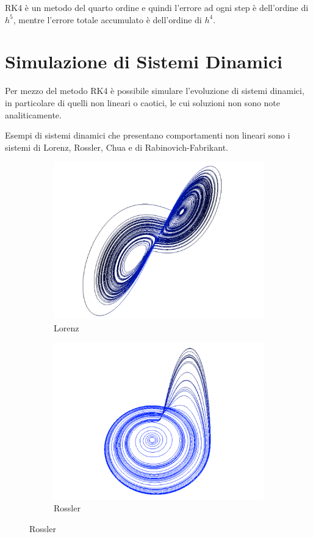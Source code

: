RK4 è un metodo del quarto ordine e quindi l'errore ad ogni step è dell'ordine di $h^5$, mentre l'errore totale accumulato è dell'ordine di $h^4$.

\section{Simulazione di Sistemi Dinamici}
Per mezzo del metodo RK4 è possibile simulare l'evoluzione di sistemi dinamici, in particolare di quelli non lineari o caotici, le cui soluzioni non sono note analiticamente.

Esempi di sistemi dinamici che presentano comportamenti non lineari sono i sistemi di Lorenz, Rossler, Chua e di Rabinovich-Fabrikant.

\begin{figure}[H]
 \begin{subfigure}[b]{0.5\textwidth}
  \centering
  \includegraphics[width=\textwidth]{lorenz}
  \caption{Lorenz}
  \label{fig:lorenz}
 \end{subfigure}
 \begin{subfigure}[b]{0.5\textwidth}
  \centering
  \includegraphics[width=\textwidth]{rossler}
  \caption{Rossler}
  \label{fig:rossler}
 \end{subfigure}


\end{figure}
